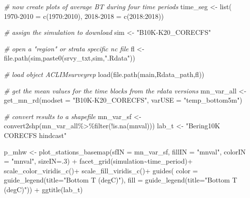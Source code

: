 \documentclass[
]{article}
\newenvironment{Shaded}{\begin{snugshade}}{\end{snugshade}}
\newcommand{\AttributeTok}[1]{\textcolor[rgb]{0.77,0.63,0.00}{#1}}
\newcommand{\CommentTok}[1]{\textcolor[rgb]{0.56,0.35,0.01}{\textit{#1}}}
\newcommand{\DecValTok}[1]{\textcolor[rgb]{0.00,0.00,0.81}{#1}}
\newcommand{\FunctionTok}[1]{\textcolor[rgb]{0.00,0.00,0.00}{#1}}
\newcommand{\NormalTok}[1]{#1}
\newcommand{\OtherTok}[1]{\textcolor[rgb]{0.56,0.35,0.01}{#1}}
\newcommand{\SpecialCharTok}[1]{\textcolor[rgb]{0.00,0.00,0.00}{#1}}
\newcommand{\StringTok}[1]{\textcolor[rgb]{0.31,0.60,0.02}{#1}}
\begin{document}
\begin{Shaded}
\begin{Highlighting}[]
    \CommentTok{\# now create plots of average BT during four time periods}
\NormalTok{    time\_seg   }\OtherTok{\textless{}{-}} \FunctionTok{list}\NormalTok{( }\StringTok{\textquotesingle{}1970{-}2010\textquotesingle{}} \OtherTok{=} \FunctionTok{c}\NormalTok{(}\DecValTok{1970}\SpecialCharTok{:}\DecValTok{2010}\NormalTok{),}
                        \StringTok{\textquotesingle{}2018{-}2018\textquotesingle{}} \OtherTok{=} \FunctionTok{c}\NormalTok{(}\DecValTok{2018}\SpecialCharTok{:}\DecValTok{2018}\NormalTok{))}
  
    \CommentTok{\# assign the simulation to download}
\NormalTok{    sim        }\OtherTok{\textless{}{-}} \StringTok{"B10K{-}K20\_CORECFS"} 
    
    \CommentTok{\# open a "region" or strata specific nc file}
\NormalTok{    fl         }\OtherTok{\textless{}{-}} \FunctionTok{file.path}\NormalTok{(sim,}\FunctionTok{paste0}\NormalTok{(srvy\_txt,sim,}\StringTok{".Rdata"}\NormalTok{))}
     
    \CommentTok{\# load object \textquotesingle{}ACLIMsurveyrep\textquotesingle{}}
    \FunctionTok{load}\NormalTok{(}\FunctionTok{file.path}\NormalTok{(main,Rdata\_path,fl))   }
      
    \CommentTok{\# get the mean values for the time blocks from the rdata versions}
\NormalTok{    mn\_var\_all }\OtherTok{\textless{}{-}} \FunctionTok{get\_mn\_rd}\NormalTok{(}\AttributeTok{modset =} \StringTok{"B10K{-}K20\_CORECFS"}\NormalTok{,}
                            \AttributeTok{varUSE =} \StringTok{"temp\_bottom5m"}\NormalTok{)}
    
    \CommentTok{\# convert results to a shapefile}
\NormalTok{    mn\_var\_sf  }\OtherTok{\textless{}{-}} \FunctionTok{convert2shp}\NormalTok{(mn\_var\_all}\SpecialCharTok{\%\textgreater{}\%}\FunctionTok{filter}\NormalTok{(}\SpecialCharTok{!}\FunctionTok{is.na}\NormalTok{(mnval)))}
\NormalTok{    lab\_t      }\OtherTok{\textless{}{-}} \StringTok{"Bering10K CORECFS hindcast"}
    
\NormalTok{    p\_mhw      }\OtherTok{\textless{}{-}} \FunctionTok{plot\_stations\_basemap}\NormalTok{(}\AttributeTok{sfIN =}\NormalTok{ mn\_var\_sf,}
                                \AttributeTok{fillIN =} \StringTok{"mnval"}\NormalTok{,}
                                \AttributeTok{colorIN =} \StringTok{"mnval"}\NormalTok{,}
                                \AttributeTok{sizeIN=}\NormalTok{.}\DecValTok{3}\NormalTok{) }\SpecialCharTok{+}
      \FunctionTok{facet\_grid}\NormalTok{(simulation}\SpecialCharTok{\textasciitilde{}}\NormalTok{time\_period)}\SpecialCharTok{+}
      \FunctionTok{scale\_color\_viridis\_c}\NormalTok{()}\SpecialCharTok{+}
      \FunctionTok{scale\_fill\_viridis\_c}\NormalTok{()}\SpecialCharTok{+}
      \FunctionTok{guides}\NormalTok{(}
        \AttributeTok{color =}  \FunctionTok{guide\_legend}\NormalTok{(}\AttributeTok{title=}\StringTok{"Bottom T (degC)"}\NormalTok{),}
        \AttributeTok{fill  =}  \FunctionTok{guide\_legend}\NormalTok{(}\AttributeTok{title=}\StringTok{"Bottom T (degC)"}\NormalTok{)) }\SpecialCharTok{+}
      \FunctionTok{ggtitle}\NormalTok{(lab\_t)}
   

\end{Highlighting}
\end{Shaded}
\end{document}
